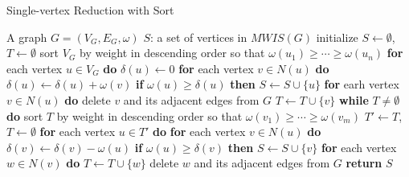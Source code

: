 \documentclass[sigconf, nonacm]{acmart}
\begin{document}
\begin{algorithm}[tbp]
\caption{Single-vertex Reduction with Sort}
\label{alg:1vertexsort}
\begin{algorithmic}[1]
	\REQUIRE A graph $G=(V_G,E_G,\omega)$
	\ENSURE $S$: a set of vertices in $MWIS(G)$
	\STATE   initialize $S\leftarrow \emptyset$, $T\leftarrow \emptyset$
	\STATE   sort $V_G$ by weight in descending order so that $\omega(u_1)\geq\cdots\geq\omega(u_n)$
	\STATE   \textbf{for} each vertex $u\in V_G$ \textbf{do}
	\STATE   \quad $\delta(u)\leftarrow 0$
	\STATE   \quad \textbf{for} each vertex $v\in N(u)$ \textbf{do}
	\STATE   \quad \quad $\delta(u)\leftarrow\delta(u) + \omega(v)$
	\STATE   \quad \textbf{if} $\omega(u)\geq\delta(u)$ \textbf{then}
	\STATE   \quad \quad $S \leftarrow S\cup \{u\}$
	\STATE   \quad \quad \textbf{for} earh vertex $v\in N(u)$ \textbf{do}
	\STATE   \quad \quad \quad delete $v$ and its adjacent edges from $G$
	\STATE   \quad \quad \quad $T \leftarrow T\cup \{v\}$
	\STATE   \textbf{while} $T\neq \emptyset$ \textbf{do}
	\STATE   \quad sort $T$ by weight in descending order so that $\omega(v_1)\geq\cdots\geq\omega(v_m)$
	\STATE   \quad $T' \leftarrow T$, $T\leftarrow \emptyset$
	\STATE   \quad \textbf{for} each vertex $u\in T'$ \textbf{do}
	\STATE   \quad \quad \textbf{for} each vertex $v\in N(u)$ \textbf{do}
	\STATE   \quad \quad \quad $\delta(v) \leftarrow \delta(v) - \omega(u)$
	\STATE   \quad \quad \textbf{if} $\omega(u)\geq \delta(v)$ \textbf{then}
	\STATE   \quad \quad \quad $S\leftarrow S\cup\{v\}$
	\STATE   \quad \quad \quad \textbf{for} each vertex $w\in N(v)$ \textbf{do}
	\STATE   \quad \quad \quad \quad $T\leftarrow T\cup\{w\}$
	\STATE   \quad \quad \quad \quad delete $w$ and its adjacent edges from $G$
	\STATE   \textbf{return} $S$
\end{algorithmic}
\end{algorithm}
\end{document}
